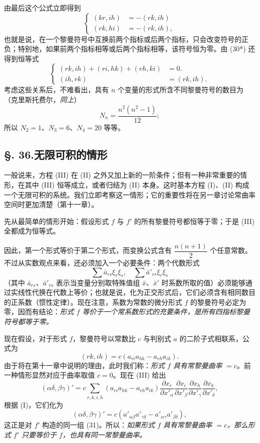 由最后这个公式立即得到
\begin{equation}\tag{a}
\left\{
\begin{aligned}
(kr,ih)&=-(rk,ih)\\
(rk,hi)&=-(rk,ih),
\end{aligned}
\right.
\end{equation}
也就是说，在一个黎曼符号中互换前两个指标或后两个指标，只会改变符号的正负；特别地，如果前两个指标相等或后两个指标相等，该符号恒为零。由 (30*) 还得到恒等式
\begin{equation}\tag{b}
\left\{
\begin{aligned}
(rk,ih)+(ri,hk)+(rh,ki)&=0.\\
(ih,rk)&=(rk,ih).
\end{aligned}
\right.
\end{equation}
考虑这些关系后，不难看出，具有 $n$ 个变量的形式所含不同黎曼符号的数目为（克里斯托费尔，\emph{同上}）
\[
N_n=\frac{n^2(n^2-1)}{12};
\]
所以 $N_2=1$、$N_3=6$、$N_4=20$ 等等。

\subsection*{\S. 36.\quad 无限可积的情形}
一般说来，方程 (III) 在 (II) 之外又加上新的一阶条件；但有一种非常重要的情形，在其中 (III) 恒等成立，或者归结为 (II) 本身。这时基本方程 (I)、(II) 构成一个无限可积的系统。我们立即考察这一情形；它的重要性将在另一章讨论常曲率空间时更加清楚（第十一章）。

先从最简单的情形开始：假设形式 $f$ 与 $f'$ 的所有黎曼符号都恒等于零；于是 (III) 全都成为恒等式。

因此，第一个形式等价于第二个形式，而变换公式含有 $\dfrac{n(n+1)}{2}$ 个任意常数。不过从实数观点来看，还必须加入一个必要条件：两个代数形式
\[
\sum \bar a_{rs}\xi_r\xi_s,\quad \sum \bar a'_{rs}\xi_r\xi_s
\]
（其中 $\bar a_{rs}$、$\bar a'_{rs}$ 表示当变量分别取特殊值组 $\bar x$、$\bar x'$ 时系数所取的值）必须能够通过实线性代换在代数上等价；也就是说，化为正交形式后，它们必须含有相同数目的正系数（惯性定律）。现在注意，系数为常数的微分形式 $f$ 的黎曼符号必定为零，因而有结论：\emph{形式 $f$ 等价于一个常系数形式的充要条件，是所有四指标黎曼符号都等于零。}

现在假设，对于形式 $f$，黎曼符号以常数比 $c$ 与判别式 $a$ 的二阶子式相联系，公式为
\begin{equation}\tag{31}
(rk,ih)=c\left(a_{ri}a_{hk}-a_{rh}a_{ik}\right).
\end{equation}
由于将在第十一章中说明的理由，此时我们称：\emph{形式 $f$ 具有常黎曼曲率 $=c$}。前一种情形显然对应于曲率取值 $c=0$。现在 (III) 给出
\[
(\alpha\delta,\beta\gamma)'=c\sum_{r,k,i,h}\left(a_{ri}a_{hk}-a_{rh}a_{ik}\right)
\frac{\partial x_r}{\partial x'_\alpha}\frac{\partial x_i}{\partial x'_\beta}\frac{\partial x_h}{\partial x'_\gamma}\frac{\partial x_k}{\partial x'_\delta},
\]
根据 (I)，它们化为
\begin{equation}\tag{31*}
(\alpha\delta,\beta\gamma)'=c\left(a'_{\alpha\beta}a'_{\gamma\delta}-a'_{\alpha\gamma}a'_{\beta\delta}\right),
\end{equation}
这正是对 $f'$ 构造的同一组 (31)。所以：\emph{如果形式 $f$ 具有常黎曼曲率 $=c$，那么形式 $f'$ 只要等价于 $f$，也具有同一常黎曼曲率。}

